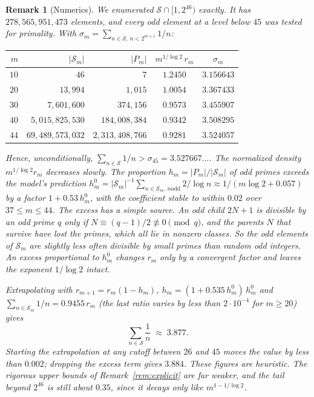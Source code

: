 \documentclass[11pt]{amsart}
\newtheorem{remark}[lemma]{Remark}
\newcommand{\Sset}{\mathcal{S}}
\begin{document}
\begin{remark}[Numerics]
\label{rem:numerics}
We enumerated $\Sset \cap [1, 2^{46})$ exactly. It has $278{,}565{,}951{,}473$
elements, and every odd element at a level below $45$ was tested for
primality. With $\sigma_m = \sum_{n \in \Sset,\, n < 2^{m+1}} 1/n$:
\begin{center}
\begin{tabular}{rrrcc}
$m$ & $|\Sset_m|$ & $|P_m|$ & $m^{1/\log 2}\, r_m$ & $\sigma_m$ \\
\hline
$10$ & $46$ & $7$ & $1.2450$ & $3.156643$ \\
$20$ & $13{,}994$ & $1{,}015$ & $1.0054$ & $3.367433$ \\
$30$ & $7{,}601{,}600$ & $374{,}156$ & $0.9573$ & $3.455907$ \\
$40$ & $5{,}015{,}825{,}530$ & $184{,}008{,}384$ & $0.9342$ & $3.508295$ \\
$44$ & $69{,}489{,}573{,}032$ & $2{,}313{,}408{,}766$ & $0.9281$ & $3.524057$
\end{tabular}
\end{center}
Hence, unconditionally, $\sum_{n \in \Sset} 1/n > \sigma_{45} =
3.527667\ldots$. The normalized density $m^{1/\log 2} r_m$ decreases
slowly. The proportion $h_m = |P_m|/|\Sset_m|$ of odd primes exceeds the
model's prediction $h^0_m = |\Sset_m|^{-1}\sum_{n \in \Sset_m,\, n \text{
odd}} 2/\log n \approx 1/(m \log 2 + 0.057)$ by a factor $1 + 0.53\,h^0_m$,
with the coefficient stable to within $0.02$ over $37 \le m \le 44$. The
excess has a simple source. An odd child $2N+1$ is divisible by an odd
prime $q$ only if $N \equiv (q-1)/2 \not\equiv 0 \pmod q$, and the parents
$N$ that survive have lost the primes, which all lie in nonzero classes.
So the odd elements of $\Sset_m$ are slightly less often divisible by
small primes than random odd integers. An excess proportional to $h^0_m$
changes $r_m$ only by a convergent factor and leaves the exponent
$1/\log 2$ intact.

Extrapolating with $r_{m+1} = r_m(1 - h_m)$, $h_m = (1 + 0.535\,
h^0_m)\, h^0_m$ and $\sum_{n \in \Sset_m} 1/n = 0.9455\, r_m$ (the last
ratio varies by less than $2 \cdot 10^{-4}$ for $m \ge 20$) gives
\[
\sum_{n \in \Sset} \frac{1}{n} \;\approx\; 3.877 .
\]
Starting the extrapolation at any cutoff between $26$ and $45$ moves the
value by less than $0.002$; dropping the excess term gives $3.884$. These
figures are heuristic. The rigorous upper bounds of
Remark~\ref{rem:explicit} are far weaker, and the tail beyond $2^{46}$ is
still about $0.35$, since it decays only like $m^{1 - 1/\log 2}$.
\end{remark}
\end{document}
